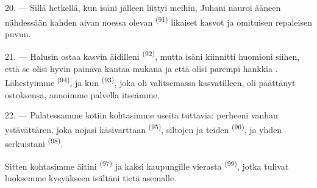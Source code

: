 \VUsaut{3.0mm}

20. --- Sillä hetkellä, kun isäni jälleen liittyi meihin, Juhani nauroi
ääneen nähdessään kahden aivan noessa olevan 
\textsuperscript{(91)} likaiset kasvot ja omituisen repaleisen puvun.

21. --- Halusin ostaa kasvin äidilleni 
\textsuperscript{(92)}, mutta isäni kiinnitti huomioni siihen, että se olisi
hyvin painava kantaa mukana ja että olisi parempi hankkia .
Lähestyimme  \textsuperscript{(94)}, ja kun
 \textsuperscript{(93)}, joka oli valitsemassa
kasvatilleen, oli päättänyt ostoksensa, annoimme palvella itseämme.

22. --- Palatessamme kotiin kohtasimme useita tuttavia: perheeni vanhan
ystävättären, joka nojasi käsivarttaan 
\textsuperscript{(95)}, siltojen ja teiden 
\textsuperscript{(96)}, ja yhden serkuistani 
\textsuperscript{(98)}.

Sitten kohtasimme äitini  \textsuperscript{(97)} ja kaksi
kaupungille vierasta  \textsuperscript{(99)}, jotka tulivat
luoksemme kysyäkseen isältäni tietä asemalle.

\VUsaut{6.0mm}
\VUfilet{22mm}
